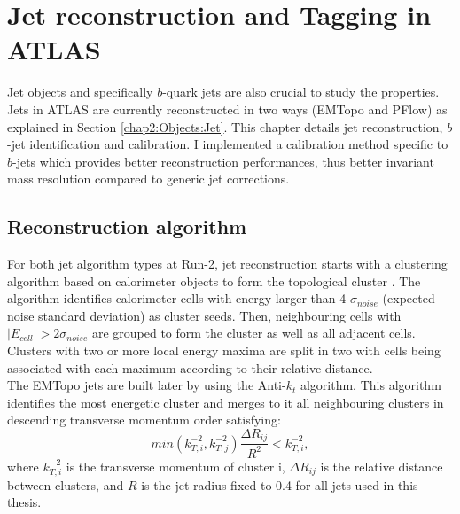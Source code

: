 \newpage
\chapter{Jet reconstruction and Tagging in ATLAS}
\label{Jet}
Jet objects and specifically $b$-quark jets are also crucial to study the \HHyybb properties. Jets in ATLAS are currently reconstructed in two ways (EMTopo and PFlow) as explained in Section \ref{chap2:Objects:Jet}. This chapter details jet reconstruction, $b$-jet identification and calibration. I implemented a calibration method specific to $b$-jets which provides better reconstruction performances, thus better \mbb invariant mass resolution compared to generic jet corrections.

\section{Reconstruction algorithm}
\label{Jet:JR}
For both jet algorithm types at Run-2, jet reconstruction starts with a clustering algorithm based on calorimeter objects to form the topological cluster \cite{Jet_Algo_Perf}. The algorithm identifies calorimeter cells with energy larger than 4 $\sigma_{noise}$ (expected noise standard deviation) as cluster seeds. Then, neighbouring cells with $|E_{cell}| > 2\sigma_{noise}$ are grouped to form the cluster as well as all adjacent cells. Clusters with two or more local energy maxima are split in two with cells being associated with each maximum according to their relative distance. \\
The EMTopo jets are built later by using the Anti-$k_t$ algorithm. This algorithm identifies the most energetic cluster and merges to it all neighbouring clusters in descending transverse momentum order satisfying:
\begin{equation}
    min(k_{T,i}^{-2}, k_{T,j}^{-2}) \frac{\Delta R_{ij}}{R^2} < k_{T,i}^{-2},
\end{equation}
where $k_{T,i}^{-2}$ is the transverse momentum of cluster i, $\Delta R_{ij}$ is the relative distance between clusters, and $R$ is the jet radius fixed to 0.4 for all jets used in this thesis. \\
